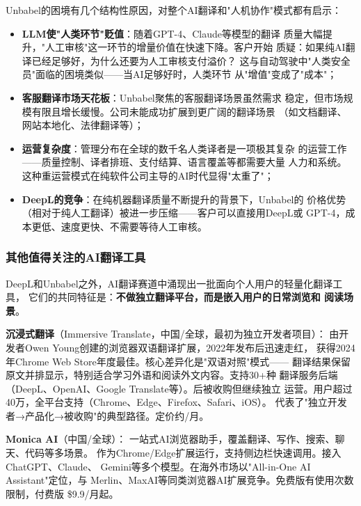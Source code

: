 \begin{corebox}[Unbabel衰落的教训]
Unbabel的困境有几个结构性原因，对整个AI翻译和"人机协作"模式都有启示：
\begin{itemize}
  \item \textbf{LLM使"人类环节"贬值}：随着GPT-4、Claude等模型的翻译
    质量大幅提升，"人工审核"这一环节的增量价值在快速下降。客户开始
    质疑：如果纯AI翻译已经足够好，为什么还要为人工审核支付溢价？
    这与自动驾驶中"人类安全员"面临的困境类似——当AI足够好时，人类环节
    从"增值"变成了"成本"；
  \item \textbf{客服翻译市场天花板}：Unbabel聚焦的客服翻译场景虽然需求
    稳定，但市场规模有限且增长缓慢。公司未能成功扩展到更广阔的翻译场景
    （如文档翻译、网站本地化、法律翻译等）；
  \item \textbf{运营复杂度}：管理分布在全球的数千名人类译者是一项极其复杂
    的运营工作——质量控制、译者排班、支付结算、语言覆盖等都需要大量
    人力和系统。这种重运营模式在纯软件公司主导的AI时代显得"太重了"；
  \item \textbf{DeepL的竞争}：在纯机器翻译质量不断提升的背景下，Unbabel的
    价格优势（相对于纯人工翻译）被进一步压缩——客户可以直接用DeepL或
    GPT-4，成本更低、速度更快、不需要等待人工审核。
\end{itemize}
\end{corebox}

\subsubsection{其他值得关注的AI翻译工具}

DeepL和Unbabel之外，AI翻译赛道中涌现出一批面向个人用户的轻量化翻译工具，
它们的共同特征是：\textbf{不做独立翻译平台，而是嵌入用户的日常浏览和
阅读场景}。

\textbf{沉浸式翻译}（Immersive Translate，中国/全球，最初为独立开发者项目）：
由开发者Owen Young创建的浏览器双语翻译扩展，2022年发布后迅速走红，
获得2024年Chrome Web Store年度最佳。核心差异化是"双语对照"模式——
翻译结果保留原文并排显示，特别适合学习外语和阅读外文内容。支持30+种
翻译服务后端（DeepL、OpenAI、Google Translate等）。后被收购但继续独立
运营。用户超过40万，全平台支持（Chrome、Edge、Firefox、Safari、iOS）。
代表了"独立开发者→产品化→被收购"的典型路径。定价约/月。

\textbf{Monica AI}（中国/全球）：
一站式AI浏览器助手，覆盖翻译、写作、搜索、聊天、代码等多场景。
作为Chrome/Edge扩展运行，支持侧边栏快速调用。接入ChatGPT、Claude、
Gemini等多个模型。在海外市场以"All-in-One AI Assistant"定位，与
Merlin、MaxAI等同类浏览器AI扩展竞争。免费版有使用次数限制，付费版
\$9.9/月起。

